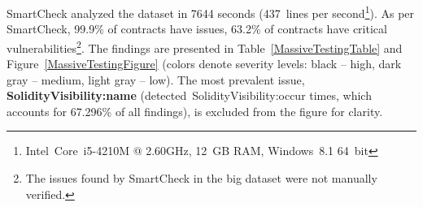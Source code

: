 SmartCheck analyzed the dataset in 7644 seconds (437~lines per second\footnote{Intel~Core~i5-4210M @ 2.60GHz, 12~GB RAM, Windows~8.1 64~bit}).
As per SmartCheck, 99.9\% of contracts have issues, 63.2\% of contracts have critical vulnerabilities\footnote{The issues found by SmartCheck in the big dataset were not manually verified.}.
The findings are presented in Table~\ref{MassiveTestingTable} and Figure~\ref{MassiveTestingFigure} (colors denote severity levels: black -- high, dark gray -- medium, light gray -- low).
The most prevalent issue, \textbf{\let\letcs\texapiletcs \usevalue SolidityVisibility:name \let\letcs\etoolboxletcs} (detected~{\let\letcs\texapiletcs \usevalue SolidityVisibility:occur \let\letcs\etoolboxletcs} times, which accounts for 67.296\% of all findings), is excluded from the figure for clarity.

